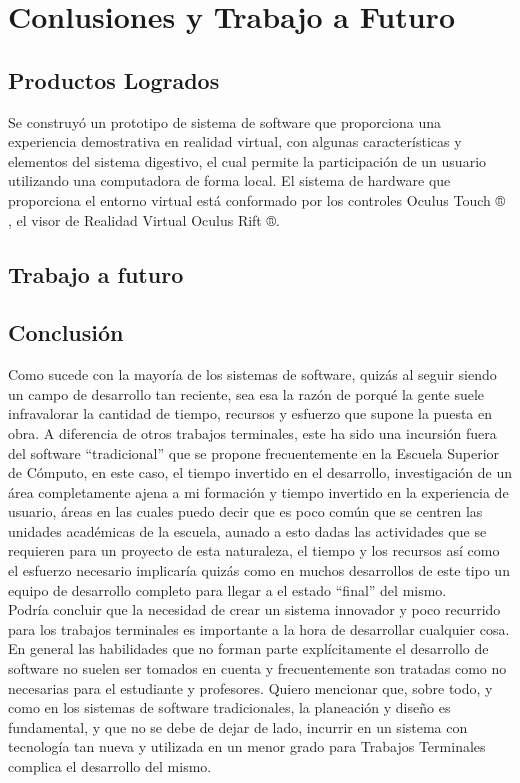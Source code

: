 \chapter{Conlusiones y Trabajo a Futuro}

\section{Productos Logrados}
Se construyó un prototipo de sistema de  software que proporciona una experiencia demostrativa en realidad virtual, con algunas características y 
elementos del sistema digestivo, el cual  permite la participación de un usuario utilizando una computadora de forma local. El sistema de hardware 
que proporciona el entorno virtual está conformado por los controles Oculus Touch ® , el visor de Realidad Virtual Oculus Rift ®. 

\section{Trabajo a futuro}

\section{Conclusión}
Como sucede con la mayoría de los sistemas de software, quizás al seguir siendo un campo de desarrollo tan reciente, sea esa la razón de porqué la gente suele infravalorar la cantidad de tiempo, recursos y esfuerzo que supone la puesta en obra. A diferencia de otros trabajos terminales, este ha sido una incursión fuera del software “tradicional” que se propone frecuentemente en la Escuela Superior de Cómputo, en este caso, el tiempo invertido en el desarrollo, investigación de un área completamente ajena a mi formación y tiempo invertido en la experiencia de usuario, áreas en las cuales puedo decir que es poco común que se centren las unidades académicas de la escuela, aunado a esto dadas las actividades que se requieren para un proyecto de esta naturaleza, el tiempo y los recursos así como el esfuerzo necesario implicaría quizás como en muchos desarrollos de este tipo un equipo de desarrollo completo para llegar a el estado “final” del mismo.\\
 
Podría concluir que la necesidad de crear un sistema innovador y poco recurrido para los trabajos terminales es importante a la hora de desarrollar cualquier cosa.\\

En general las habilidades que no forman parte explícitamente el desarrollo de software no suelen ser tomados en cuenta y frecuentemente son tratadas como no necesarias para el estudiante y profesores. Quiero mencionar que, sobre todo, y como en los sistemas de software tradicionales, la planeación y diseño es fundamental, y que no se debe de dejar de lado, incurrir en un sistema con tecnología tan nueva y utilizada en un menor grado para Trabajos Terminales complica el desarrollo del mismo.\\

